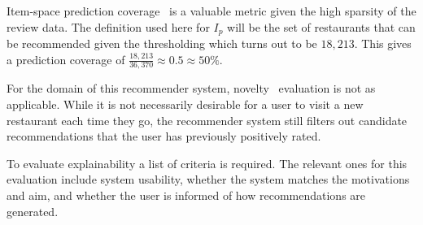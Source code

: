 Item-space prediction coverage~\cite{ge2010beyond} is a valuable metric given the high sparsity of the review data.
The definition used here for $I_p$ will be the set of restaurants that can be recommended given the thresholding which turns out to be $18,213$.
This gives a prediction coverage of $\frac{18,213}{36,370} \approx 0.5 \approx 50\%$.

For the domain of this recommender system, novelty~\cite{kaminskas2016diversity} evaluation is not as applicable.
While it is not necessarily desirable for a user to visit a new restaurant each time they go, the recommender system still filters out candidate recommendations that the user has previously positively rated.

To evaluate explainability a list of criteria is required.
The relevant ones for this evaluation include system usability, whether the system matches the motivations and aim, and whether the user is informed of how recommendations are generated.
